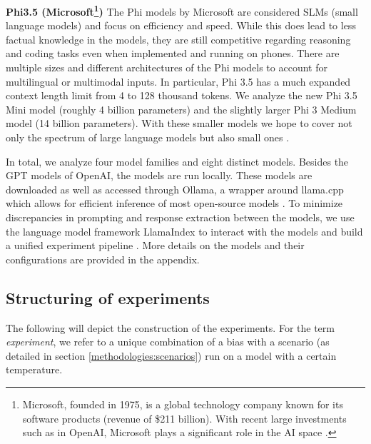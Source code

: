 \par \textbf{Phi3.5 (Microsoft\footnote{Microsoft, founded in 1975, is a global technology company known for its software products (revenue of \$211 billion). With recent large investments such as in OpenAI, Microsoft plays a significant role in the AI space \parencite{microsoft2024about}.})} The Phi models by Microsoft are considered SLMs (small language models) and focus on efficiency and speed. While this does lead to less factual knowledge in the models, they are still competitive regarding reasoning and coding tasks even when implemented and running on phones. There are multiple sizes and different architectures of the Phi models to account for multilingual or multimodal inputs. In particular, Phi 3.5 has a much expanded context length limit from 4 to 128 thousand tokens. We analyze the new Phi 3.5 Mini model (roughly 4 billion parameters) and the slightly larger Phi 3 Medium model (14 billion parameters). With these smaller models we hope to cover not only the spectrum of large language models but also small ones \parencite{abdin2024phi}.

\setlength{\parindent}{0pt}
\par In total, we analyze four model families and eight distinct models. Besides the GPT models of OpenAI, the models are run locally. These models are downloaded as well as accessed through Ollama, a wrapper around llama.cpp which allows for efficient inference of most open-source models \parencite{gerganov2023llamacpp}. To minimize discrepancies in prompting and response extraction between the models, we use the language model framework LlamaIndex to interact with the models and build a unified experiment pipeline \parencite{liullamaindex2022}. More details on the models and their configurations are provided in the appendix.


\subsection{Structuring of experiments}
\par The following will depict the construction of the experiments. For the term \textit{experiment}, we refer to a unique combination of a bias with a scenario (as detailed in section \ref{methodologies:scenarios}) run on a model with a certain temperature.


